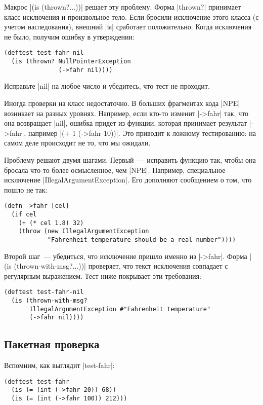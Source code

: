 Макрос \spverb|(is (thrown?...))| решает эту проблему. Форма \spverb|thrown?|
принимает класс исключения и произвольное тело. Если бросили исключение этого
класса (с учетом наследования), внешний \spverb|is| сработает
положительно. Когда исключения не было, получим ошибку в утверждении:

\begin{verbatim}
(deftest test-fahr-nil
  (is (thrown? NullPointerException
               (->fahr nil))))
\end{verbatim}

Исправьте \spverb|nil| на любое число и убедитесь, что тест не проходит.

Иногда проверки на класс недостаточно. В больших фрагментах кода \spverb|NPE|
возникает на разных уровнях. Например, если кто-то изменит \spverb|->fahr| так,
что она возвращает \spverb|nil|, ошибка придет из функции, которая принимает
результат \spverb|->fahr|, например \spverb|(+ 1 (->fahr 10))|. Это приводит к
ложному тестированию: на самом деле происходит не то, что мы ожидали.

Проблему решают двумя шагами. Первый~--- исправить функцию так, чтобы она
бросала что-то более осмысленное, чем \spverb|NPE|. Например, специальное
исключение \spverb|IllegalArgumentException|. Его дополняют сообщением о том,
что пошло не так:

\begin{verbatim}
(defn ->fahr [cel]
  (if cel
    (+ (* cel 1.8) 32)
    (throw (new IllegalArgumentException
            "Fahrenheit temperature should be a real number"))))
\end{verbatim}

Второй шаг~--- убедиться, что исключение пришло именно из \spverb|->fahr|. Форма
\spverb|(is (thrown-with-msg?...))| проверяет, что текст исключения совпадает с
регулярным выражением. Тест ниже покрывает эти требования:

\begin{verbatim}
(deftest test-fahr-nil
  (is (thrown-with-msg?
       IllegalArgumentException #"Fahrenheit temperature"
       (->fahr nil))))
\end{verbatim}

\subsection{Пакетная проверка}

Вспомним, как выглядит \spverb|test-fahr|:

\begin{verbatim}
(deftest test-fahr
  (is (= (int (->fahr 20)) 68))
  (is (= (int (->fahr 100)) 212)))
\end{verbatim}

